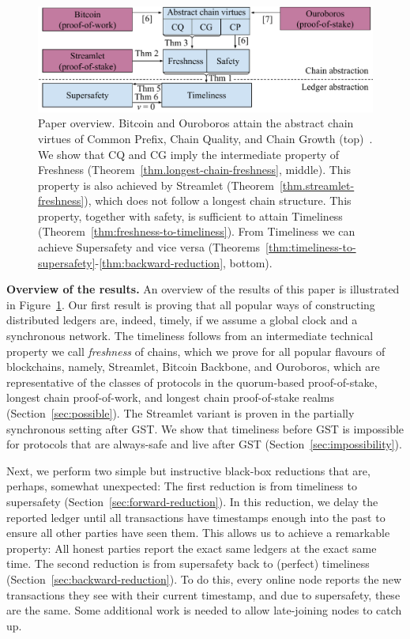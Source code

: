 \begin{figure}
  \centering
  \includegraphics[width=1.0\columnwidth,keepaspectratio]{figures/timeliness-overview.pdf}
  \caption{Paper overview. Bitcoin and Ouroboros attain the abstract chain virtues
  of Common Prefix, Chain Quality, and Chain Growth (top)~\cite{backbone,ouroboros}.
  We show that CQ and CG imply the intermediate property of Freshness
  (Theorem~\ref{thm.longest-chain-freshness}, middle). This property is also achieved by Streamlet
  (Theorem~\ref{thm.streamlet-freshness}), which does
  not follow a longest chain structure. This property, together with safety,
  is sufficient to attain Timeliness
  (Theorem~\ref{thm:freshness-to-timeliness}). From Timeliness we can achieve Supersafety
  and vice versa (Theorems~\ref{thm:timeliness-to-supersafety}-\ref{thm:backward-reduction}, bottom).
  }
 \label{fig:overview}
\end{figure}

\noindent
\textbf{Overview of the results.}
An overview of the results of this paper is illustrated in Figure~\ref{fig:overview}.
Our first result is proving that all popular ways of constructing distributed ledgers
are, indeed, timely, if we assume a global clock and a synchronous network.
The timeliness follows from an intermediate technical property we call \emph{freshness}
of chains, which we prove for all popular flavours of blockchains, namely,
Streamlet, Bitcoin Backbone, and Ouroboros, which are representative
of the classes of protocols in the quorum-based proof-of-stake, longest chain
proof-of-work, and longest chain proof-of-stake realms (Section~\ref{sec:possible}).
The Streamlet variant is proven in the partially synchronous setting after GST.
We show that timeliness before GST is impossible for protocols that are always-safe
and live after GST (Section~\ref{sec:impossibility}).

Next, we perform two simple but instructive black-box reductions that are, perhaps, somewhat unexpected:
The first reduction is from timeliness to supersafety (Section~\ref{sec:forward-reduction}).
In this reduction, we delay the reported ledger until all
transactions have timestamps enough into the past to ensure all other parties have seen them.
This allows us to achieve a remarkable property: All honest parties report the
exact same ledgers at the exact same time.
The second reduction is from supersafety back to (perfect) timeliness (Section~\ref{sec:backward-reduction}).
To do this, every online node reports the new transactions they see with
their current timestamp, and due to supersafety, these are the same.
Some additional work is needed to allow late-joining nodes to catch up.

